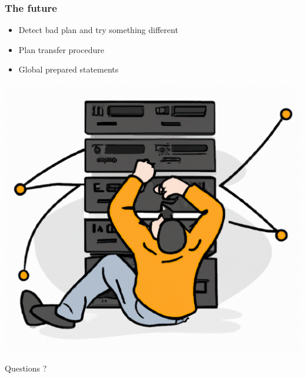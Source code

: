 \documentclass{beamer}
\begin{document}
\begin{frame}[fragile]\frametitle{The future}
\begin{itemize}
  \item Detect bad plan and try something different
  \item Plan transfer procedure
  \item Global prepared statements
\end{itemize}
\end{frame}

\begin{frame}
\begin{center}
\begin{center}
\includegraphics[scale=0.1]{project_logo}
\end{center}
\huge{Questions ?}
\end{center}
\end{frame}
\end{document}
